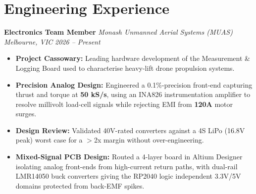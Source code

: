 \documentclass[10pt,a4paper]{article}
\begin{document}
\section{Engineering Experience}

\textbf{Electronics Team Member} \hfill \textit{Monash Unmanned Aerial Systems (MUAS)} \\
\textit{Melbourne, VIC} \hfill \textit{2026 -- Present}
\begin{itemize}[noitemsep, topsep=1pt, leftmargin=*]
    \item \textbf{Project Cassowary:} Leading hardware development of the Measurement \& Logging Board used to characterise heavy-lift drone propulsion systems.
    \item \textbf{Precision Analog Design:} Engineered a 0.1\%-precision front-end capturing thrust and torque at \textbf{50 kS/s}, using an INA826 instrumentation amplifier to resolve millivolt load-cell signals while rejecting EMI from \textbf{120A} motor surges.
    \item \textbf{Design Review:} Validated 40V-rated converters against a 4S LiPo (16.8V peak) worst case for a $>$2x margin without over-engineering.
    \item \textbf{Mixed-Signal PCB Design:} Routed a 4-layer board in Altium Designer isolating analog front-ends from high-current return paths, with dual-rail LMR14050 buck converters giving the RP2040 logic independent 3.3V/5V domains protected from back-EMF spikes.
\end{itemize}

\vspace{1pt}
\end{document}
